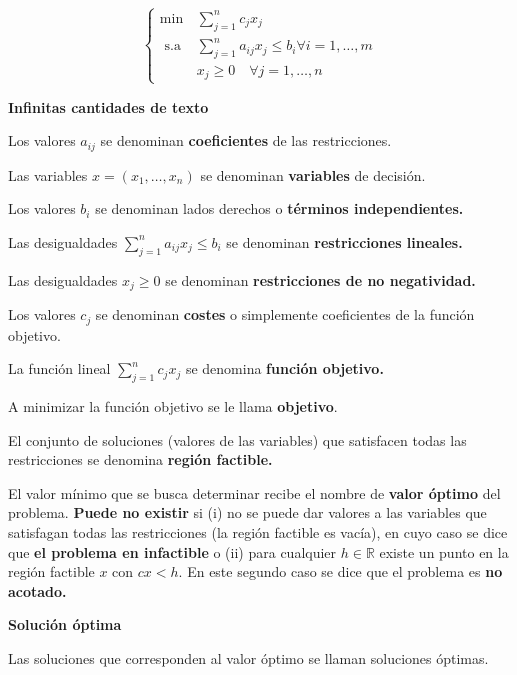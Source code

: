 \documentclass[openany]{book}
\begin{document}
$$
\begin{cases}\min & \sum_{j=1}^{n} c_{j} x_{j} \\ \text { s.a } & \sum_{j=1}^{n} a_{i j} x_{j} \leq b_{i} \forall i=1, \ldots, m \\ & x_{j} \geq 0 \quad \forall j=1, \ldots, n\end{cases}
$$

\begin{definition}
  { \color{turquoise} \textbf{Infinitas cantidades de texto}}


  Los valores $a_{i j}$ se denominan \textbf{coeficientes} de las restricciones.

  Las variables $x=\left(x_{1}, \ldots, x_{n}\right)$ se denominan \textbf{variables} de decisión.

  Los valores $b_{i}$ se denominan lados derechos o \textbf{términos independientes.}

  Las desigualdades $\sum_{j=1}^{n} a_{i j} x_{j} \leq b_{i}$ se denominan \textbf{restricciones lineales.}

  Las desigualdades $x_{j} \geq 0$ se denominan \textbf{restricciones de no negatividad.}

  Los valores $c_{j}$ se denominan \textbf{costes} o simplemente coeficientes de la función objetivo.

  La función lineal $\sum_{j=1}^{n} c_{j} x_{j}$ se denomina \textbf{función objetivo.}

  A minimizar la función objetivo se le llama \textbf{objetivo}.

  El conjunto de soluciones (valores de las variables) que satisfacen todas las restricciones se denomina \textbf{región factible.}
\end{definition}


El valor mínimo que se busca determinar recibe el nombre de \textbf{valor óptimo} del problema. \textbf{Puede no existir} si (i) no se puede dar valores a las variables que satisfagan todas las restricciones (la región factible es vacía), en cuyo caso se dice que \textbf{el problema en infactible} o (ii) para cualquier $h \in \mathbb{R}$ existe un punto en la región factible $x$ con $c x<h$. En este segundo caso se dice que el problema es \textbf{no acotado.}

\begin{definition}
  { \color{turquoise} \textbf{Solución óptima}}

  Las soluciones que corresponden al valor óptimo se llaman soluciones óptimas.
\end{definition}
\end{document}
